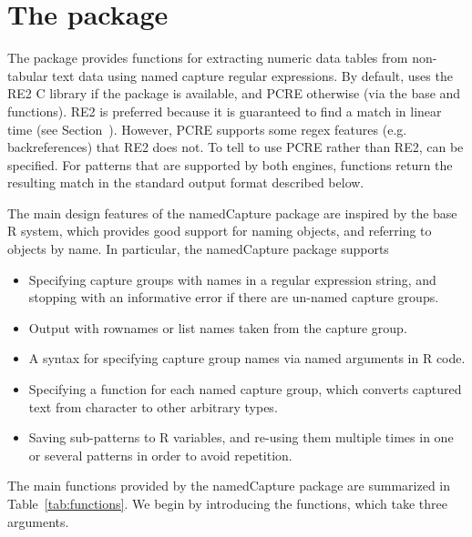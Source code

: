 \section{The  package}

The  package provides functions for extracting
numeric data tables from non-tabular text data using named capture
regular expressions. By default,  uses the RE2 C
library if the  package is available, and PCRE otherwise
(via the base  and  functions). RE2 is
preferred because it is guaranteed to find a match in linear time (see
Section~\sectiontimings). However, PCRE supports some regex features
(e.g. backreferences) that RE2 does not. To tell
 to use PCRE rather than RE2,
 can be specified. For
patterns that are supported by both engines, 
functions return the resulting match in the standard output format
described below.

The main design features of the namedCapture package are
inspired by the base R system, which provides good support for
naming objects, and referring to objects by name. In particular, the namedCapture package supports 
\begin{itemize}
\item Specifying capture groups with names in a regular expression
  string, and stopping with an informative error if there are un-named
  capture groups.
\item Output with rownames or list names taken from the  capture group.
\item A syntax for specifying capture group names via named arguments
  in R code.
\item Specifying a function for each named capture group,
  which converts captured text from character to other arbitrary types.
\item Saving sub-patterns to R variables, and re-using them multiple
  times in one or several patterns in order to avoid repetition.
\end{itemize}

The main functions provided by the namedCapture package are summarized
in Table~\ref{tab:functions}. We begin by introducing the  functions, which take three arguments.

